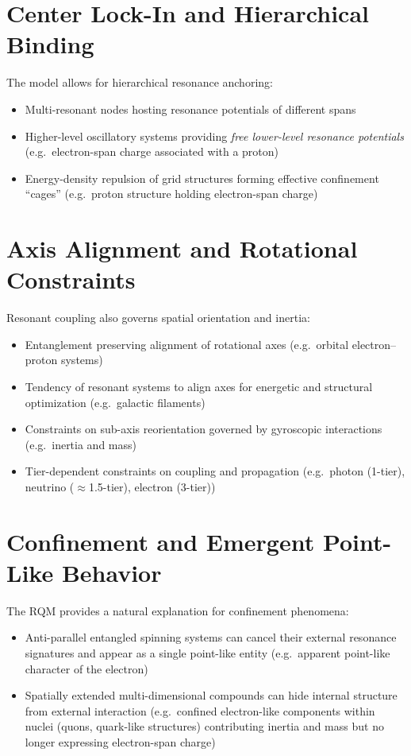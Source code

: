 \section{Center Lock-In and Hierarchical Binding}

The model allows for hierarchical resonance anchoring:

\begin{itemize}
  \item Multi-resonant nodes hosting resonance potentials of different spans
  \item Higher-level oscillatory systems providing \emph{free lower-level resonance potentials} (e.g.\ electron-span charge associated with a proton)
  \item Energy-density repulsion of grid structures forming effective confinement ``cages'' (e.g.\ proton structure holding electron-span charge)
\end{itemize}

\section{Axis Alignment and Rotational Constraints}

Resonant coupling also governs spatial orientation and inertia:

\begin{itemize}
  \item Entanglement preserving alignment of rotational axes (e.g.\ orbital electron--proton systems)
  \item Tendency of resonant systems to align axes for energetic and structural optimization (e.g.\ galactic filaments)
  \item Constraints on sub-axis reorientation governed by gyroscopic interactions (e.g.\ inertia and mass)
  \item Tier-dependent constraints on coupling and propagation (e.g.\ photon (1-tier), neutrino ($\approx$1.5-tier), electron (3-tier))
\end{itemize}

\section{Confinement and Emergent Point-Like Behavior}

The RQM provides a natural explanation for confinement phenomena:

\begin{itemize}
  \item Anti-parallel entangled spinning systems can cancel their external resonance signatures and appear as a single point-like entity (e.g.\ apparent point-like character of the electron)
  \item Spatially extended multi-dimensional compounds can hide internal structure from external interaction (e.g.\ confined electron-like components within nuclei (quons, quark-like structures) contributing inertia and mass but no longer expressing electron-span charge)
\end{itemize}

